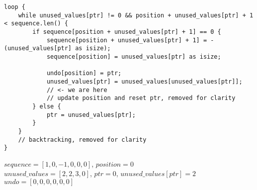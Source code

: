 \begin{frame}[fragile]
    \begin{verbatim}
loop {
    while unused_values[ptr] != 0 && position + unused_values[ptr] + 1 < sequence.len() {
        if sequence[position + unused_values[ptr] + 1] == 0 {
            sequence[position + unused_values[ptr] + 1] = -(unused_values[ptr] as isize);
            sequence[position] = unused_values[ptr] as isize;

            undo[position] = ptr;
            unused_values[ptr] = unused_values[unused_values[ptr]];
            // <- we are here
            // update position and reset ptr, removed for clarity
        } else {
            ptr = unused_values[ptr];
        }
    }
    // backtracking, removed for clarity
}
    \end{verbatim}
    $sequence = [1, 0, -1, 0, 0, 0]$, $position = 0$\\
    $unused\_values = [2, 2, 3, 0]$, $ptr = 0$, $unused\_values[ptr] = 2$\\
    $undo = [0, 0, 0, 0, 0, 0]$
\end{frame}